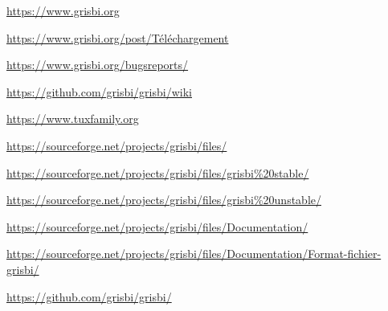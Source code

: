 

\urldef{\urlGrisbi}%
\url{https://www.grisbi.org}

\urldef{\urlGrisbiTelechargement}%
\url{https://www.grisbi.org/post/Téléchargement}

\urldef{\urlBugTracker}%
\url{https://www.grisbi.org/bugsreports/}

\urldef{\urlGrisbiWiki}%
\url{https://github.com/grisbi/grisbi/wiki}

\urldef{\urlTuxFamily}%
\url{https://www.tuxfamily.org}

\urldef{\urlSourceForge}%
\url{https://sourceforge.net/projects/grisbi/files/}

\urldef{\urlSourceForgeGrisbiStable}%
\url{https://sourceforge.net/projects/grisbi/files/grisbi\%20stable/}

\urldef{\urlSourceForgeGrisbiInstable}%
\url{https://sourceforge.net/projects/grisbi/files/grisbi\%20unstable/}

\urldef{\urlSourceForgeDocumentation}%
\url{https://sourceforge.net/projects/grisbi/files/Documentation/}

\urldef{\urlSourceForgeDocumentationFormat}%
\url{https://sourceforge.net/projects/grisbi/files/Documentation/Format-fichier-grisbi/}

\urldef{\urlGitHubGrisbi}%
\url{https://github.com/grisbi/grisbi/}

